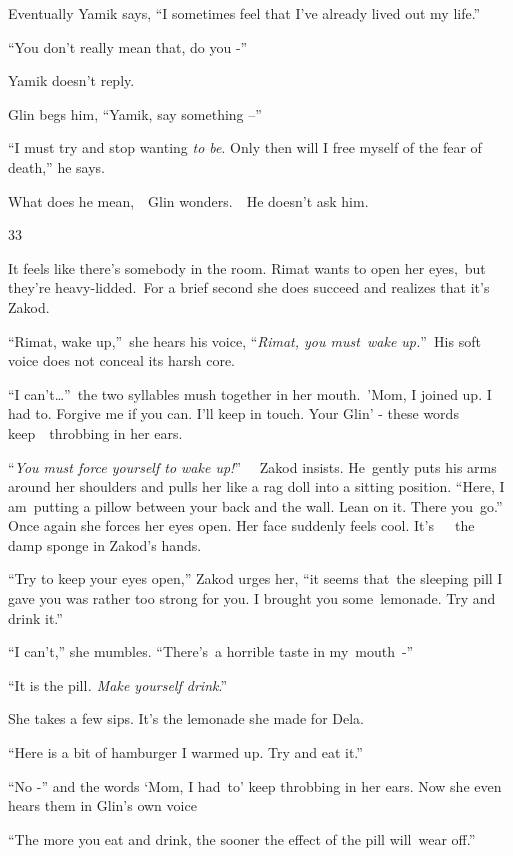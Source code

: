 \documentclass[twoside,11pt]{book}
\begin{document}
Eventually Yamik says, ``I sometimes feel that I've already lived out my life.'' 

``You don't really mean that, do you -''

Yamik doesn't reply.

Glin begs him, ``Yamik, say something --'' 

``I must try and stop wanting \textit{to be}. Only then will I free myself of the fear of
death,'' he says. 

What does he mean,\ \ Glin wonders.\ \ He doesn't ask him.


\bigskip

33 

It feels like there{}'s somebody in the room. Rimat wants to open her eyes,\ but they're heavy-lidded.\ For a brief
second she does succeed and realizes that it{}'s Zakod.\ 

``Rimat, wake up,''\ she hears his voice, ``\textit{Rimat, you must\ wake up.}{}''\textit{\ }His soft voice
does not conceal its harsh core. 

{}``I can{}'t{\dots}''\  the two syllables mush together in her mouth.\ {}'Mom, I joined up. I had to. Forgive me if you
can. I{}'ll keep in touch. Your Glin{}' - these  words  keep\ \ throbbing  in her ears.

{}``\textit{You must force yourself to wake up!}{}'' \textit{\ }\ Zakod insists. He\ gently puts his arms around her
shoulders and pulls her like a rag doll into a sitting position. ``Here, I am\ putting a pillow between your back and
the wall. Lean on it. There you\ go.{}'' Once again she forces her eyes open. Her face suddenly feels cool.
It{}'s\ \ \ the damp sponge in Zakod{}'s hands. 

{}``Try to keep your eyes open,'' Zakod urges her, ``it seems that\ the sleeping pill I gave you was rather too strong
for you. I brought you some\ lemonade. Try and drink it.''

{}``I can{}'t,{}'' she mumbles. ``There{}'s\ a horrible taste in my\ mouth\ {}-''\ 

{}``It is the pill\textit{. Make yourself drink}.{}''\ 

She takes a few sips. It's the lemonade she made for Dela.

{}``Here is a bit of hamburger I warmed up. Try and eat it.{}''

{}``No -{}'' and the words `Mom, I had\ to' keep throbbing in her ears. Now she even hears them in Glin's own voice

{}``The more you eat and drink, the sooner the effect of the pill will\ wear off.''
\end{document}
